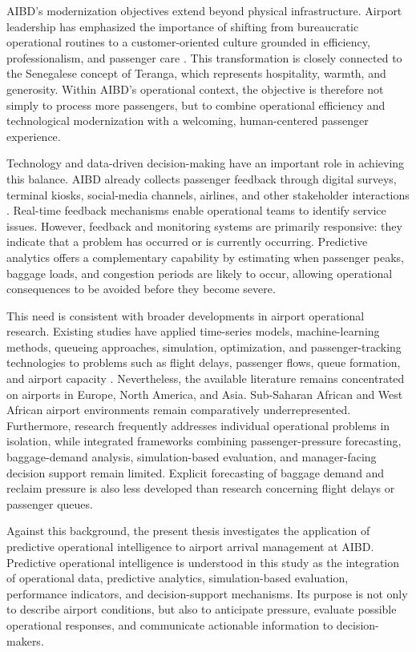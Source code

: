 AIBD's modernization objectives extend beyond physical infrastructure. Airport leadership has emphasized the importance of shifting from bureaucratic operational routines to a customer-oriented culture grounded in efficiency, professionalism, and passenger care \parencite{demir2025speaker}. This transformation is closely connected to the Senegalese concept of Teranga, which represents hospitality, warmth, and generosity. Within AIBD's operational context, the objective is therefore not simply to process more passengers, but to combine operational efficiency and technological modernization with a welcoming, human-centered passenger experience.

Technology and data-driven decision-making have an important role in achieving this balance. AIBD already collects passenger feedback through digital surveys, terminal kiosks, social-media channels, airlines, and other stakeholder interactions \parencite{demir2025speaker}. Real-time feedback mechanisms enable operational teams to identify service issues. However, feedback and monitoring systems are primarily responsive: they indicate that a problem has occurred or is currently occurring. Predictive analytics offers a complementary capability by estimating when passenger peaks, baggage loads, and congestion periods are likely to occur, allowing operational consequences to be avoided before they become severe.

This need is consistent with broader developments in airport operational research. Existing studies have applied time-series models, machine-learning methods, queueing approaches, simulation, optimization, and passenger-tracking technologies to problems such as flight delays, passenger flows, queue formation, and airport capacity \parencite{orsini2019neural,shao2022predicting,pang2024machine,cao2025robust,sang2026integrating}. Nevertheless, the available literature remains concentrated on airports in Europe, North America, and Asia. Sub-Saharan African and West African airport environments remain comparatively underrepresented. Furthermore, research frequently addresses individual operational problems in isolation, while integrated frameworks combining passenger-pressure forecasting, baggage-demand analysis, simulation-based evaluation, and manager-facing decision support remain limited. Explicit forecasting of baggage demand and reclaim pressure is also less developed than research concerning flight delays or passenger queues.

Against this background, the present thesis investigates the application of predictive operational intelligence to airport arrival management at AIBD. Predictive operational intelligence is understood in this study as the integration of operational data, predictive analytics, simulation-based evaluation, performance indicators, and decision-support mechanisms. Its purpose is not only to describe airport conditions, but also to anticipate pressure, evaluate possible operational responses, and communicate actionable information to decision-makers.

